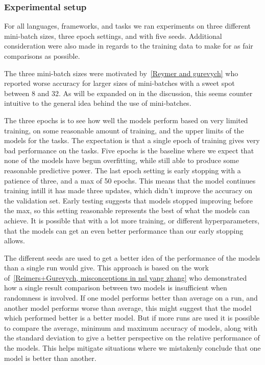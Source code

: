 \subsubsection{Experimental setup}

For all languages, frameworks, and tasks we ran experiments on three different
mini-batch sizes, three epoch settings, and with five seeds. Additional
consideration were also made in regards to the training data to make for as fair
comparisons as possible.

The three mini-batch sizes were motivated by~\ref{Reymer and gurevych} who
reported worse accuracy for larger sizes of mini-batches with a sweet spot
between 8 and 32. As will be expanded on in the discussion, this seems counter
intuitive to the general idea behind the use of mini-batches. %

The three epochs is to see how well the models perform based on very limited
training, on some reasonable amount of training, and the upper limits of the
models for the tasks. The expectation is that a single epoch of training gives
very bad performance on the tasks. Five epochs is the baseline where we expect
that none of the models have begun overfitting, while still able to produce some
reasonable predictive power. The last epoch setting is early stopping with a
patience of three, and a max of 50 epochs. This means that the model continues
training intill it has made three updates, which didn't improve the accuracy on
the validation set. Early testing suggests that models stopped improving before
the max, so this setting reasonable represents the best of what the models can
achieve. It is possible that with a lot more training, or different
hyperparameters, that the models can get an even better performance than our
early stopping allows.

The different seeds are used to get a better idea of the performance of the
models than a single run would give. This approach is based on the work
of~\ref{Reimers+Gurevych, misconceptions in nsl yang zhang} who demonstrated how
a single result comparison between two models is insufficient when randomness is
involved. If one model performs better than average on a run, and another model
performs worse than average, this might suggest that the model which performed
better is a better model. But if more runs are used it is possible to compare
the average, minimum and maximum accuracy of models, along with the standard
deviation to give a better perspective on the relative performance of the
models. This helps mitigate situations where we mistakenly conclude that one
model is better than another.


